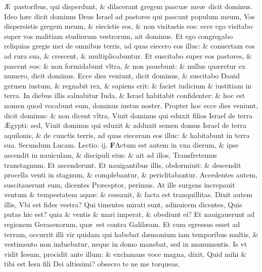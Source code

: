 \documentclass[a5paper,10pt]{book}
\def\leftmarginnote{%
	\lrmarginnote{\hskip -\marginparsep \hskip -6.5em}}
\def\ae{æ}
\def\AE{Æ}
\begin{document}
\begin{multicols*}{2}
\AE \ pastoribus,\leftmarginnote{\begin{flushright}c. 23.\end{flushright}} qui disperdunt, \& dilacerant gregem pascu\ae \ me\ae \ dicit dominus.
Ideo h\ae c dicit dominus Deus Israel ad pastores qui pascunt populum meum, Vos dispersistis gregem meum, \& eiecistis eos, \& non visitastis eos: ecce ego visitabo super vos malitiam studiorum vestrorum, ait dominus.
Et ego congregabo reliquias gregis mei de omnibus terris, ad quas eiecero eos illuc: \& conuertam eos ad rura sua, \& crescent, \& multiplicabuntur.
Et suscitabo super eos pastores, \& pascent eos: \& non formidabunt vltra, \& non pauebunt: \& nullus qu\ae retur ex numero, dicit dominus.
Ecce dies veniunt, dicit dominus, \& suscitabo Dauid germen iustum, \& regnabit rex, \& sapiens erit: \& faciet iudicium \& iustitiam in terra.
In diebus illis saluabitur Iuda, \& Israel habitabit confidenter: \& hoc est nomen quod vocabunt eum, dominus iustus noster.
Propter hoc ecce dies veniunt, dicit dominus: \& non dicent vltra, Viuit dominus qui eduxit filios Israel de terra \AE gypti: sed, Viuit dominus qui eduxit \& adduxit semen domus Israel de terra aquilonis, \& de cunctis terris, ad quas eieceram eos illuc: \& habitabunt in terra sua.
\fancyhead[C]{\color{red} Feria. vj. Dominic\ae . iij. aduentus}
\newline \color{red} Secundum Lucam. \hfill Lectio. ij. \color{black}
\vspace{-.25em}
\lettrine[lines=2]{\bfseries \color{red} F}{}Actum\leftmarginnote{\begin{flushright}ca. 8.\end{flushright}} est autem in vna dierum, \& ipse ascendit in nauiculam, \& discipuli eius: \& ait ad illos, Transfretemus transtagnum.
Et ascenderunt. Et nauigantibus illis, obdormiuit: \& descendit procella venti in stagnum, \& complebantur, \& periclitabantur.
Accedentes autem, suscitauerunt eum, dicentes Pr\ae ceptor, perimus.
At ille surgens increpauit ventum \& tempestatem aqu\ae : \& cessauit, \& facta est tranquillitas.
Dixit autem illis, Vbi est fides vestra? Qui timentes mirati sunt, adinuicem dicentes, Quis putas hic est? quia \& ventis \& mari imperat, \& obediunt ei?
Et nauigauerunt ad regionem Gerasenorum, qu\ae \ est contra Galil\ae am.
Et cum egressus esset ad terram, occurrit illi vir quidam qui habebat d\ae monium iam temporibus multis, \& vestimento non induebatur, neque in domo manebat, sed in monumentis.
Is vt vidit Iesum, procidit ante illum: \& exclamans voce magna, dixit, Quid mihi \& tibi est Iesu fili Dei altissimi? obsecro te ne me torqueas.

\end{multicols*}
\end{document}
